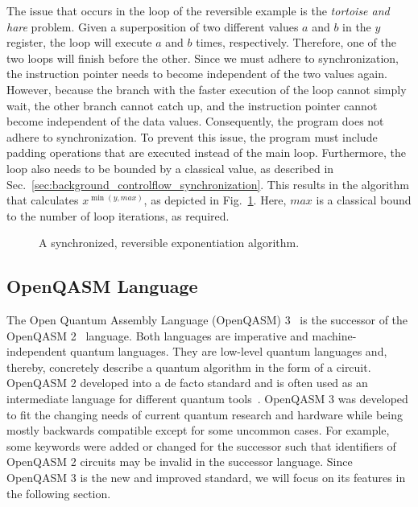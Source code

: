 The issue that occurs in the loop of the reversible example is the \emph{tortoise and hare} problem. Given a superposition of two different values $a$ and $b$ in the $y$ register, the loop will execute $a$ and $b$ times, respectively. Therefore, one of the two loops will finish before the other. Since we must adhere to synchronization, the instruction pointer needs to become independent of the two values again. However, because the branch with the faster execution of the loop cannot simply wait, the other branch cannot catch up, and the instruction pointer cannot become independent of the data values. Consequently, the program does not adhere to synchronization. 
To prevent this issue, the program must include padding operations that are executed instead of the main loop. Furthermore, the loop also needs to be bounded by a classical value, as described in Sec.~\ref{sec:background_controlflow_synchronization}. This results in the algorithm that calculates $x^{\min{(y, max)}}$, as depicted in Fig.~\ref{fig:qcm_sync}. Here, $max$ is a classical bound to the number of loop iterations, as required.

\begin{figure}[htp]
    \centering     
    
    \caption{A synchronized, reversible exponentiation algorithm.}
    \label{fig:qcm_sync}
\end{figure}

\subsection{OpenQASM Language}
\label{sec:background_qasm}
The Open Quantum Assembly Language (OpenQASM) 3~\cite{CJA*22} is the successor of the OpenQASM 2~\cite{CBSG17} language.
Both languages are imperative and machine-independent quantum languages. They are low-level quantum languages and, thereby, concretely describe a quantum algorithm in the form of a circuit. OpenQASM 2 developed into a de facto standard and is often used as an intermediate language for different quantum tools~\cite{CJA*22}. OpenQASM 3 was developed to fit the changing needs of current quantum research and hardware while being mostly backwards compatible except for some uncommon cases. For example, some keywords were added or changed for the successor such that identifiers of OpenQASM 2 circuits may be invalid in the successor language. Since OpenQASM 3 is the new and improved standard, we will focus on its features in the following section.

